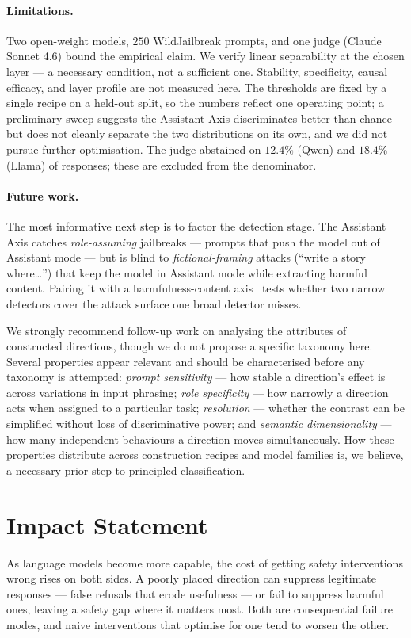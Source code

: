 \documentclass{article}
\begin{document}
\paragraph{Limitations.}
Two open-weight models, $250$ WildJailbreak prompts, and one judge
(Claude Sonnet 4.6) bound the empirical claim. We verify linear
separability at the chosen layer --- a necessary condition, not a
sufficient one. Stability, specificity, causal efficacy, and layer
profile are not measured here. The thresholds are fixed by a single
recipe on a held-out split, so the numbers reflect one operating
point; a preliminary sweep suggests the Assistant Axis discriminates
better than chance but does not cleanly separate the two
distributions on its own, and we did not pursue further optimisation.
The judge abstained on $12.4\%$ (Qwen) and $18.4\%$ (Llama) of
responses; these are excluded from the denominator.

\paragraph{Future work.}
The most informative next step is to factor the detection stage.
The Assistant Axis catches \emph{role-assuming} jailbreaks --- prompts
that push the model out of Assistant mode --- but is blind to
\emph{fictional-framing} attacks (``write a story where\ldots'')
that keep the model in Assistant mode while extracting harmful
content. Pairing it with a harmfulness-content
axis~\cite{zhao2025separately} tests whether two narrow detectors
cover the attack surface one broad detector misses.

We strongly recommend follow-up work on analysing the attributes of
constructed directions, though we do not propose a specific taxonomy
here. Several properties appear relevant and should be characterised
before any taxonomy is attempted: \emph{prompt sensitivity} --- how
stable a direction's effect is across variations in input phrasing;
\emph{role specificity} --- how narrowly a direction acts when
assigned to a particular task; \emph{resolution} --- whether the
contrast can be simplified without loss of discriminative power; and
\emph{semantic dimensionality} --- how many independent behaviours a
direction moves simultaneously. How these properties distribute
across construction recipes and model families is, we believe, a
necessary prior step to principled classification.

\clearpage
\section*{Impact Statement}
As language models become more capable, the cost of getting safety
interventions wrong rises on both sides. A poorly placed direction
can suppress legitimate responses --- false refusals that erode
usefulness --- or fail to suppress harmful ones, leaving a safety
gap where it matters most. Both are consequential failure modes,
and naive interventions that optimise for one tend to worsen the
other.
\end{document}

